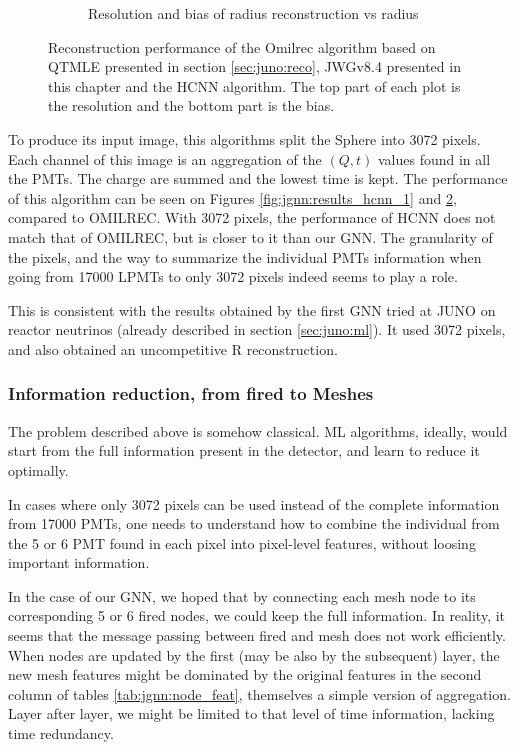 \documentclass[../main.tex]{subfiles}
\begin{document}
\begin{figure}[ht]
\begin{subfigure}[t]{0.48\linewidth}
    \caption{Resolution and bias of radius reconstruction vs radius}
    \label{fig:jgnn:MSBvRTC_hcnn}
  \end{subfigure}
  \caption{Reconstruction performance of the Omilrec algorithm based on QTMLE presented in section \ref{sec:juno:reco}, JWGv8.4 presented in this chapter and the HCNN algorithm. The top part of each plot is the resolution and the bottom part is the bias.}
  \label{fig:jgnn:results_hcnn_2}
\end{figure}


To produce its input image, this algorithms split the Sphere into 3072 pixels. Each channel of this image is an aggregation of the $(Q, t)$ values found in all the PMTs. The charge are summed and the lowest time is kept. The performance of this algorithm can be seen on Figures \ref{fig:jgnn:results_hcnn_1} and \ref{fig:jgnn:results_hcnn_2}, compared to OMILREC. With 3072 pixels, the performance of HCNN does not match that of OMILREC, but is closer to it than our GNN. The granularity of the pixels, and the way to summarize the individual PMTs information when going from 17000 LPMTs to only 3072 pixels indeed seems to play a role.

This is consistent with the results obtained by the first GNN tried at JUNO on reactor neutrinos (already described in section \ref{sec:juno:ml}).
It used 3072 pixels, and also obtained an uncompetitive R reconstruction.

\subsubsection{Information reduction, from fired to Meshes}

The problem described above is somehow classical. ML algorithms, ideally, would start from the full information present in the detector, and learn to reduce it optimally.

In cases where only 3072 pixels can be used instead of the complete information from 17000 PMTs, one needs to understand how to combine the individual from the 5 or 6 PMT found in each pixel into pixel-level features, without loosing important information.

In the case of our GNN, we hoped that by connecting each mesh node to its corresponding 5 or 6 fired nodes, we could keep the full information. In reality, it seems that the message passing between fired and mesh does not work efficiently. When nodes are updated by the first (may be also by the subsequent) layer, the new mesh features might be dominated by the original features in the second column of tables \ref{tab:jgnn:node_feat}, themselves a simple version of aggregation.
Layer after layer, we might be limited to that level of time information, lacking time redundancy.
\end{document}
